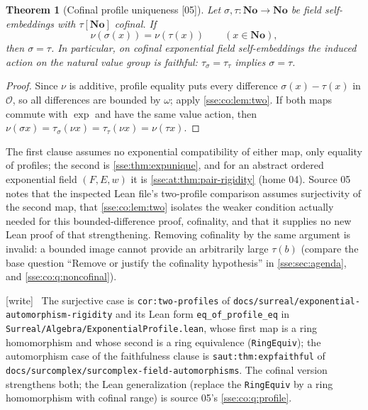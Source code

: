 \documentclass[11pt,a4paper]{article}
\numberwithin{equation}{section}
\theoremstyle{plain}
\newtheorem{theorem}{Theorem}[section]
\theoremstyle{definition}
\theoremstyle{remark}
\newcommand{\No}{\mathbf{No}}
\newcommand{\code}[1]{\texttt{\small #1}}
\newcommand{\lbl}[1]{\nolinkurl{#1}}%
\newcommand{\fn}[1]{\nolinkurl{#1}}%
\newcommand{\src}[1]{\textup{\textsf{\small[#1]}}}%
\newcommand{\wtag}{\textup{\textsf{[write]}}}%
\newenvironment{wnote}{\par\smallskip\noindent\wtag\ }{\par\smallskip}
\begin{document}
\begin{theorem}[Cofinal profile uniqueness \src{05}]\label{sse:co:thm:two-profile}
Let $\sigma,\tau:\No\to\No$ be field self-embeddings with $\tau[\No]$
cofinal. If
\[
 \nu(\sigma(x))=\nu(\tau(x))\qquad(x\in\No),
\]
then $\sigma=\tau$. In particular, on cofinal exponential field
self-embeddings the induced action on the natural value group is faithful:
$\tau_\sigma=\tau_\tau$ implies $\sigma=\tau$.
\end{theorem}
\begin{proof}
Since $\nu$ is additive, profile equality puts every difference
$\sigma(x)-\tau(x)$ in $\mathcal O$, so all differences are bounded by
$\omega$; apply \cref{sse:co:lem:two}. If both maps commute with $\exp$ and
have the same value action, then
$\nu(\sigma x)=\tau_\sigma(\nu x)=\tau_\tau(\nu x)=\nu(\tau x)$.
\end{proof}
The first clause assumes no exponential compatibility of either map, only
equality of profiles; the second is \cref{sse:thm:expunique}, and for an
abstract ordered exponential field $(F,E,w)$ it is
\cref{sse:at:thm:pair-rigidity} (home 04). Source 05 notes that the
inspected Lean file's two-profile comparison assumes surjectivity of the
second map, that \cref{sse:co:lem:two} isolates the weaker condition actually
needed for this bounded-difference proof, cofinality, and that it supplies no
new Lean proof of that strengthening. Removing cofinality by the same
argument is invalid: a bounded image cannot provide an arbitrarily large
$\tau(b)$ (compare the base question ``Remove or justify the cofinality
hypothesis'' in \cref{sse:sec:agenda}, and \cref{sse:co:q:noncofinal}).
\begin{wnote}
The surjective case is \lbl{cor:two-profiles} of
\fn{docs/surreal/exponential-automorphism-rigidity} and its Lean form
\code{eq\_of\_profile\_eq} in
\fn{Surreal/Algebra/ExponentialProfile.lean}, whose first map is a ring
homomorphism and whose second is a ring equivalence (\code{RingEquiv}); the automorphism case of the
faithfulness clause is \lbl{saut:thm:expfaithful} of
\fn{docs/surcomplex/surcomplex-field-automorphisms}. The cofinal version
strengthens both; the Lean generalization (replace the \code{RingEquiv} by a
ring homomorphism with cofinal range) is source 05's
\cref{sse:co:q:profile}.
\end{wnote}
\end{document}
